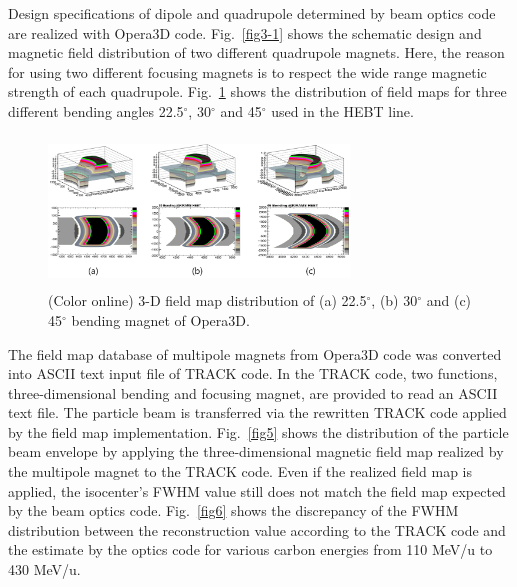 \documentclass[jkps,preprint,fleqn,showpacs,showkeys]{revtex4}
\begin{document}
Design specifications of dipole and quadrupole determined by beam optics code are realized with Opera3D code.
Fig.~\ref{fig3-1} shows the schematic design and magnetic field distribution of two different quadrupole magnets. Here, the reason for using two different
focusing magnets is to respect the wide range magnetic strength of each quadrupole.
Fig.~\ref{fig4} shows the distribution of field maps for three different bending angles 22.5$^{\circ}$, 30$^{\circ}$ and 45$^{\circ}$ used in the HEBT line.
\begin{figure}
  \begin{center}
    \includegraphics[width=8.0cm, height=4cm]{Fig05.png}
    \caption{(Color online) 3-D field map distribution of (a) 22.5$^{\circ}$, (b) 30$^{\circ}$ and (c) 45$^{\circ}$ bending magnet of Opera3D.}
    \label{fig4}
  \end{center}
\end{figure}
The field map database of multipole magnets from Opera3D code was converted into ASCII text input file of TRACK code.
In the TRACK code, two functions, three-dimensional bending and focusing magnet, are provided to read an ASCII text file.
The particle beam is transferred via the rewritten TRACK code applied by the field map implementation.
Fig.~\ref{fig5} shows the distribution of the particle beam envelope by applying the three-dimensional magnetic field map realized by the multipole magnet to the TRACK code.
Even if the realized field map is applied, the isocenter's FWHM value still does not match the field map expected by the beam optics code.
Fig.~\ref{fig6} shows the discrepancy of the FWHM distribution between the reconstruction value according to the TRACK code
and the estimate by the optics code for various carbon energies from 110 MeV/u to 430 MeV/u.   
\end{document}
